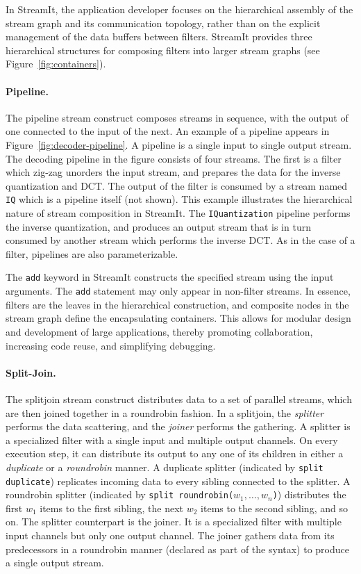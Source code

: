 In StreamIt, the application developer focuses on the hierarchical
assembly of the stream graph and its communication topology, rather
than on the  explicit management of the data buffers between filters.
StreamIt provides three hierarchical structures for composing filters
into larger stream graphs (see Figure~\ref{fig:containers}).

\paragraph{Pipeline.}
The pipeline stream construct composes streams in sequence, with
the output of one connected to the input of the next.  An example of a
pipeline appears in Figure~\ref{fig:decoder-pipeline}. A pipeline is a
single input to single output stream. The decoding pipeline in the
figure consists of four streams. The first is a filter which zig-zag
unorders the input stream, and prepares the data for the inverse
quantization and DCT. The output of the filter is consumed by a stream
named {\tt IQ} which is a pipeline itself (not shown). This example
illustrates the hierarchical nature of stream composition in
StreamIt. The {\tt IQuantization} pipeline performs the inverse quantization, and
produces an output stream that is in turn consumed by another stream
which performs the inverse DCT. As in the case of a filter, pipelines
are also parameterizable.

The {\tt add} keyword in StreamIt constructs the specified stream
using the input arguments. The {\tt add} statement may only appear in
non-filter streams.  In essence, filters are the leaves in the
hierarchical construction, and composite nodes in the stream graph
define the encapsulating containers. This allows for modular design
and development of large applications, thereby  promoting
collaboration, increasing code reuse, and simplifying debugging.

\paragraph{Split-Join.}
The splitjoin stream construct distributes data to a set of parallel
streams, which are then joined together in a roundrobin fashion. In a
splitjoin, the {\it splitter} performs the data scattering, and the
{\it joiner} performs the gathering. A splitter is a specialized
filter with a single input and multiple output channels. On every
execution step, it can distribute its output to any one of its
children in either a {\it duplicate} or a {\it roundrobin} manner.  A
duplicate splitter (indicated by \texttt{split duplicate}) replicates
incoming data to every sibling connected to the splitter.  A
roundrobin splitter (indicated by {\tt split
roundrobin($w_1,\ldots,w_n$)}) distributes the first $w_1$ items to
the first sibling, the next $w_2$ items to the second sibling, and so
on.  The splitter counterpart is the joiner. It is a specialized
filter with multiple input channels but only one output channel. The
joiner gathers data from its predecessors in a roundrobin manner
(declared as part of the syntax) to produce a single output stream.

